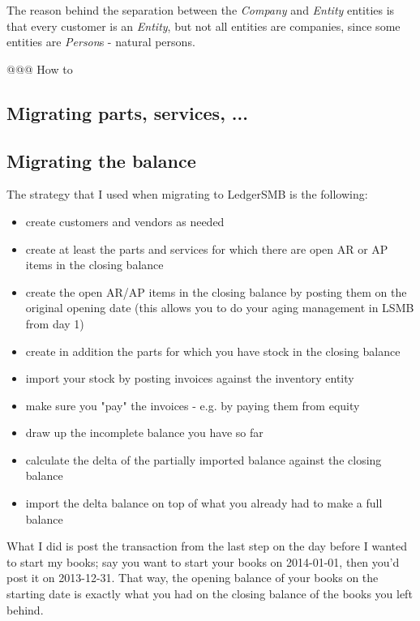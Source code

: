 The reason behind the separation between the \emph{Company} and \emph{Entity} entities
is that every customer is an \emph{Entity}, but not all entities are companies, since
some entities are \emph{Person}s - natural persons.

@@@ How to

\subsection{Migrating parts, services, ...}
\label{subsec-migration-others-products}

\subsection{Migrating the balance}
\label{subsec-migration-others-balance}

The strategy that I used when migrating to LedgerSMB is the following:

\begin{itemize}
\item create customers and vendors as needed
\item create at least the parts and services for which there are open AR or AP items in the closing balance
\item create the open AR/AP items in the closing balance by posting them on the original opening date (this allows you to do your aging management in LSMB from day 1)
\item create in addition the parts for which you have stock in the closing balance
\item import your stock by posting invoices against the inventory entity
\item make sure you "pay" the invoices - e.g. by paying them from equity
\item draw up the incomplete balance you have so far
\item calculate the delta of the partially imported balance against the closing balance
\item import the delta balance on top of what you already had to make a full balance
\end{itemize}


What I did is post the transaction from the last step on the day before I wanted to start my books; say you want to start your books on 2014-01-01, then you'd post it on 2013-12-31. That way, the opening balance of your books on the starting date is exactly what you had on the closing balance of the books you left behind.

